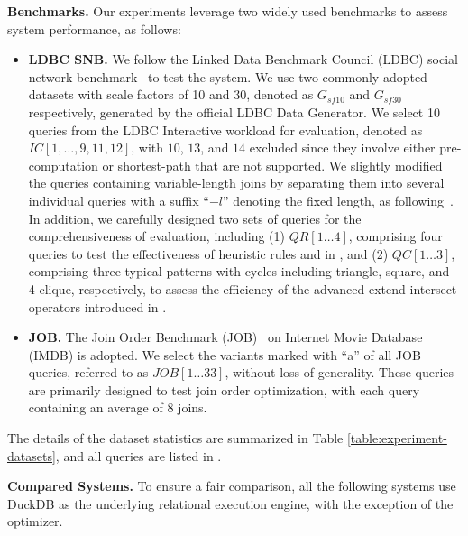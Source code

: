 \noindent\textbf{Benchmarks.} Our experiments leverage two widely used benchmarks to assess system performance, as follows:
\begin{itemize}
    \item \textbf{LDBC SNB.} We follow the Linked Data Benchmark Council (LDBC) social network benchmark~\cite{ldbc_snb} to test the system. We use two commonly-adopted datasets with scale factors of 10 and 30, denoted as $G_{sf10}$ and $G_{sf30}$ respectively, generated by the official LDBC Data Generator.
    We select 10 queries from the LDBC Interactive workload for evaluation, denoted as $IC[1, \ldots, 9, 11, 12]$, with $10$, $13$, and $14$ excluded since they involve either pre-computation or shortest-path that are not supported.
    We slightly modified the queries containing variable-length joins by separating them into several individual queries with a suffix ``$-l$'' denoting the fixed length, as following~\cite{graindb}.
    In addition, we carefully designed two sets of queries for the comprehensiveness of evaluation, including (1) $QR[1\ldots 4]$, comprising four queries to test the effectiveness of heuristic rules \filterrule and \joinfuserule in \name, and (2) $QC[1\ldots 3]$, comprising three typical patterns with cycles including triangle, square, and 4-clique, respectively, to assess the efficiency of the advanced extend-intersect operators introduced in \name.
    \item \textbf{JOB.} The Join Order Benchmark (JOB)~\cite{job_snb} on Internet Movie Database (IMDB) is adopted. We select the variants marked with ``a'' of all JOB queries, referred to as $JOB[1\ldots 33]$, without loss of generality. These queries are primarily designed to test join order optimization, with each query containing an average of $8$ joins.
\end{itemize}
The details of the dataset statistics are summarized in Table \ref{table:experiment-datasets}, and all queries are listed in .

\noindent\textbf{Compared Systems. }
To ensure a fair comparison, all the following systems use DuckDB as the underlying relational execution engine, with the exception of the optimizer.

